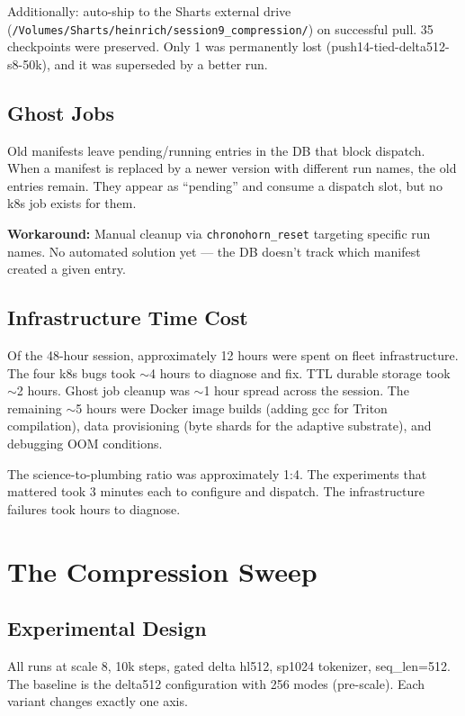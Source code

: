 \documentclass[11pt,a4paper]{report}
\begin{document}
Additionally: auto-ship to the Sharts external drive (\texttt{/Volumes/Sharts/heinrich/session9\_compression/}) on successful pull. 35 checkpoints were preserved. Only 1 was permanently lost (push14-tied-delta512-s8-50k), and it was superseded by a better run.

\section{Ghost Jobs}

Old manifests leave pending/running entries in the DB that block dispatch. When a manifest is replaced by a newer version with different run names, the old entries remain. They appear as ``pending'' and consume a dispatch slot, but no k8s job exists for them.

\textbf{Workaround:} Manual cleanup via \texttt{chronohorn\_reset} targeting specific run names. No automated solution yet --- the DB doesn't track which manifest created a given entry.

\section{Infrastructure Time Cost}

Of the 48-hour session, approximately 12 hours were spent on fleet infrastructure. The four k8s bugs took $\sim$4 hours to diagnose and fix. TTL durable storage took $\sim$2 hours. Ghost job cleanup was $\sim$1 hour spread across the session. The remaining $\sim$5 hours were Docker image builds (adding gcc for Triton compilation), data provisioning (byte shards for the adaptive substrate), and debugging OOM conditions.

The science-to-plumbing ratio was approximately 1:4. The experiments that mattered took 3 minutes each to configure and dispatch. The infrastructure failures took hours to diagnose.


\chapter{The Compression Sweep}

\section{Experimental Design}

All runs at scale 8, 10k steps, gated delta hl512, sp1024 tokenizer, seq\_len=512. The baseline is the delta512 configuration with 256 modes (pre-scale). Each variant changes exactly one axis.
\end{document}
